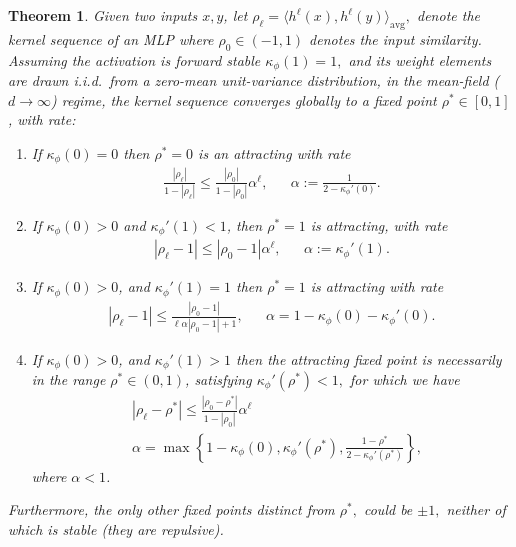 \documentclass[twoside]{article}
\newcommand{\km}{\kappa_\phi}
\newtheorem{theorem}{Theorem}
\theoremstyle{definition}
\newcommand{\thomas}[1]{{\color{blue}\textit{#1}}}
\begin{document}
\begin{theorem}
\label{thm:global_attract}
Given two inputs $x,y$, let $\rho_\ell = \langle h^\ell(x),h^\ell(y)\rangle_{\text{avg}},$ denote the kernel sequence of an MLP where ${\rho_0\in(-1,1)}$ denotes the input similarity. Assuming the activation is forward stable $\km(1)=1,$ and its weight elements are drawn i.i.d.~from a zero-mean unit-variance distribution, in the mean-field ($d\to\infty$) regime,
the kernel sequence converges globally to a fixed point $\rho^*\in[0,1]$, with rate:
\begin{enumerate}
    \item If $\km(0)=0$ then $\rho^*=0$ is an attracting with rate 
    \begin{align*}
    \frac{|\rho_\ell|}{1-|\rho_\ell|} \le \frac{|\rho_0|}{1-|\rho_0|} \alpha^\ell, && \alpha:=\frac{1}{2-\km'(0)}.
    \end{align*}
    \item If $\km(0)>0$ and $\km'(1)<1$, then $\rho^*=1$ is attracting, with rate 
    \begin{align*}
    |\rho_\ell-1| \le |\rho_0-1| \alpha ^\ell, && \alpha := \km'(1).
    \end{align*}
    \item If $\km(0) > 0$, and $\km'(1)=1$ then  $\rho^*=1$ is attracting with rate 
    \begin{align*}
    |\rho_\ell-1| \le \frac{|\rho_0-1|}{\ell\alpha|\rho_0-1|+1}, && \alpha = 1-\km(0)-\km'(0).
    \end{align*}
    \item If $\km(0) > 0$, and $\km'(1)>1$ then the attracting fixed point is necessarily in the range $\rho^*\in(0,1)$, satisfying $\km'(\rho^*) < 1,$ for which we have  
    \begin{align*}
    &|\rho_\ell-\rho^*| \le \frac{|\rho_0-\rho^*|}{1-|\rho_0|}\alpha^\ell \\ &\alpha = \max\left\{1-\km(0),\km'(\rho^*),\frac{1-\rho^*}{2-\km'(\rho^*)}\right\},
    \end{align*}
    where $\alpha<1$.
\end{enumerate}
Furthermore, the only other fixed points distinct from $\rho^*,$ could be $\pm 1,$ neither of which is stable (they are repulsive).
\end{theorem}
\end{document}
